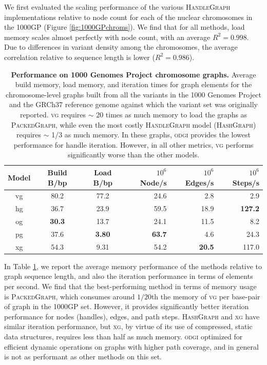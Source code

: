 \documentclass{bioinfo}
\begin{document}
We first evaluated the scaling performance of the various \textsc{HandleGraph} implementations relative to node count for each of the nuclear chromosomes in the 1000GP (Figure \ref{fig:1000GPchroms}).
We find that for all methods, load memory scales almost perfectly with node count, with an average $R^2 = 0.998$.
Due to differences in variant density among the chromosomes, the average correlation relative to sequence length is lower ($R^2 = 0.986$).

\begin{table}
  \centering
\begin{tabular}{c||c|c|r|r|r}
Model & Build B/bp & Load B/bp & $10^6$ Node/s & $10^6$ Edges/s & $10^6$ Steps/s \\
\hline
vg &   80.2 &                77.2  &              24.6 &                  2.8 &               2.9 \\
hg &   36.7 &                23.9  &              59.5 &                 18.9 &              \textbf{127.2} \\
og &   \textbf{30.3}  &   13.7  &              24.1 &                 11.5 &              8.2 \\
pg &   37.6 &                 \textbf{3.80}  &   \textbf{63.7} &   4.6 &                24.3 \\
xg &   54.3 &                9.31  &               54.2 &                 \textbf{20.5} & 117.0 \\
\hline
\end{tabular}
\caption{
  \textbf{Performance on 1000 Genomes Project chromosome graphs.}
  Average build memory, load memory, and iteration times for graph elements for the chromosome-level graphs built from all the variants in the 1000 Genomes Project and the GRCh37 reference genome against which the variant set was originally reported.
  \textsc{vg} requires $\sim$ 20 times as much memory to load the graphs as \textsc{PackedGraph}, while even the most costly \textsc{HandleGraph} model (\textsc{HashGraph}) requires $\sim$ 1/3 as much memory.
  In these graphs, \textsc{odgi} provides the lowest performance for handle iteration.
  However, in all other metrics, \textsc{vg} performs significantly worse than the other models.
}
\label{table:1000GPchroms}
\end{table}

In Table \ref{table:1000GPchroms}, we report the average memory performance of the methods relative to graph sequence length, and also the iteration performance in terms of elements per second.
We find that the best-performing method in terms of memory usage is \textsc{PackedGraph}, which consumes around $1/20$th the memory of \textsc{vg} per base-pair of graph in the 1000GP set.
However, it provides significantly better iteration performance for nodes (handles), edges, and path steps.
\textsc{HashGraph} and \textsc{xg} have similar iteration performance, but \textsc{xg}, by virtue of its use of compressed, static data structures, requires less than half as much memory.
\textsc{odgi} optimized for efficient dynamic operations on graphs with higher path coverage, and in general is not as performant as other methods on this set.
\end{document}
